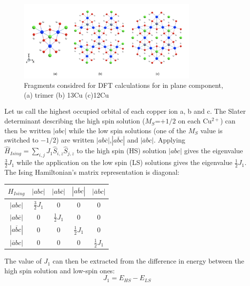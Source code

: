 \documentclass[10pt]{report}
\numberwithin{equation}{section}
\begin{document}
\begin{figure}[h!]
    \centering
    \includegraphics[width=0.8\textwidth]{Images/Groupir.png}
    \caption{Fragments considred for DFT calculations for in plane component, (a) trimer (b) 13Cu (c)12Cu}
    \label{FragmentDFT}
\end{figure}

Let us call the highest occupied orbital of each copper ion a, b and c. 
The Slater determinant describing the high spin solution ($M_S$=$+1/2$ on each Cu$^{2+}$) can then be written $|abc|$ while the low spin solutions (one of the $M_S$ value is switched to $-1/2$) are written $|ab\overline{c}|$,$|a\overline{b}c|$ and $|\overline{a}bc|$.
Applying $\hat{H}_{Ising}=\sum_{i,j}J_1 \hat{S}_{i,z}\hat{S}_{j,z}$ to the high spin (HS) solution $|abc|$ gives the eigenvalue $\frac{3}{2}J_1$ while the application on the low spin (LS) solutions gives the eigenvalue $\frac{1}{2}J_1$. 
The Ising Hamiltonian's matrix representation is diagonal:

\begin{center}
    \begin{tabular}{c | c c c c}
        $H_{Ising}$ & $|abc|$ & $|ab\overline{c}|$&$|a\overline{b}c|$ & $|\overline{a}bc|$\\
        \hline
        $|abc|$ & $\frac{3}{2}J_1$ & 0 & 0 & 0\\
        $|ab\overline{c}|$ & 0 & $\frac{1}{2}J_1 $& 0 & 0\\
        $|a\overline{b}c|$ & 0 & 0 & $\frac{1}{2}J_1 $ & 0 \\
        $|\overline{a}bc|$ & 0 & 0 & 0 & $\frac{1}{2}J_1 $
    \end{tabular}
\end{center}

The value of $J_1$ can then be extracted from the difference in energy between the high spin solution and low-spin ones:
\begin{equation}
    J_1=E_{HS}-E_{LS}
\end{equation}
\end{document}
